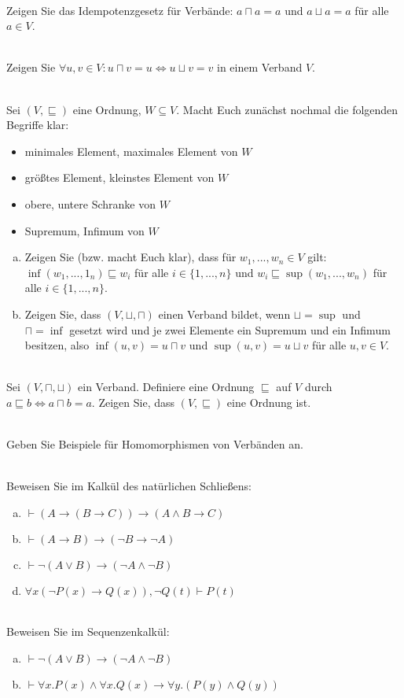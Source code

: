 \\
Zeigen Sie das Idempotenzgesetz für Verbände: $a \sqcap a = a$ und $a \sqcup a = a$ für alle $a \in V$.

\\
Zeigen Sie $\forall u,v\in V: u\sqcap v = u \Leftrightarrow u\sqcup v = v$ in einem Verband $V$.

\\
Sei $(V,\sqsubseteq)$ eine Ordnung, $W\subseteq V$. Macht Euch zunächst nochmal die folgenden Begriffe klar:
\begin{itemize}
  \item minimales Element, maximales Element von $W$
  \item größtes Element, kleinstes Element von $W$
  \item obere, untere Schranke von $W$
  \item Supremum, Infimum von $W$
\end{itemize}
\begin{enumerate}[a)]
  \item Zeigen Sie (bzw. macht Euch klar), dass für $w_1,...,w_n\in V$ gilt: $\inf(w_1,...,1_n)\sqsubseteq w_i$ für alle $i\in\{1,...,n\}$ und $w_i\sqsubseteq \sup(w_1,...,w_n)$ für alle $i\in\{1,...,n\}$.
  \item Zeigen Sie, dass $(V,\sqcup,\sqcap)$ einen Verband bildet, wenn $\sqcup=\sup$ und $\sqcap=\inf$ gesetzt wird und je zwei Elemente ein Supremum und ein Infimum besitzen, also $\inf(u,v)=u\sqcap v$ und $\sup(u,v)=u\sqcup v$ für alle $u,v\in V$.
\end{enumerate}

\\
Sei $(V,\sqcap,\sqcup)$ ein Verband. Definiere eine Ordnung $\sqsubseteq$ auf $V$ durch $a\sqsubseteq b \Leftrightarrow a\sqcap b = a$. Zeigen Sie, dass $(V,\sqsubseteq)$ eine Ordnung ist.

\\
Geben Sie Beispiele für Homomorphismen von Verbänden an.

\\
Beweisen Sie im Kalkül des natürlichen Schließens:
\begin{enumerate}[a)]
  \item $\vdash (A\to(B\to C))\to(A\wedge B\to C)$
  \item $\vdash (A\to B)\to(\neg B\to \neg A)$
  \item $\vdash\neg(A\vee B)\to(\neg A\wedge \neg B)$
  \item $\forall x(\neg P(x)\to Q(x)),\neg Q(t)\vdash P(t)$
\end{enumerate}

\\
Beweisen Sie im Sequenzenkalkül:
\begin{enumerate}[a)]
  \item $\vdash\neg(A\vee B)\to(\neg A\wedge \neg B)$
  \item $\vdash\forall x.P(x)\wedge\forall x.Q(x)\to\forall y.(P(y)\wedge Q(y))$
\end{enumerate}

